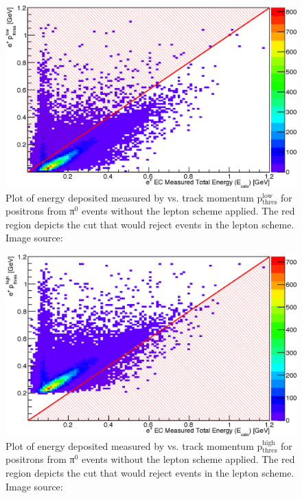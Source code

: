 \begin{figure}\begin{center}
\includegraphics[width=0.45\columnwidth]{figures/lepton/Pip_EClowcut.eps}
\caption[ Deposited Energy Comparison to Track Momentum for e$^+$ Candidates]{\label{fig:islep.pipEC}Plot of energy deposited measured by  vs. track momentum p$\mathrm{_{thres}^{low}}$ for positrons from π$^0$ events without the  lepton   scheme applied. The red region depicts the cut that would reject events in the  lepton   scheme. Image source:~\cite{clas.thesis.kunkel}}
\end{center}\end{figure}

\begin{figure}\begin{center}
\includegraphics[width=0.45\columnwidth]{figures/lepton/Pip_EChighcut.eps}
\caption[ Deposited Energy Comparison to Track Momentum for e$^+$ from π$^0$ Events]{\label{fig:islep.pipECcut}Plot of energy deposited measured by  vs. track momentum p$\mathrm{_{thres}^{high}}$ for positrons from π$^0$ events without the  lepton   scheme applied. The red region depicts the cut that would reject events in the  lepton   scheme. Image source:~\cite{clas.thesis.kunkel}}
\end{center}\end{figure}



\FloatBarrier
